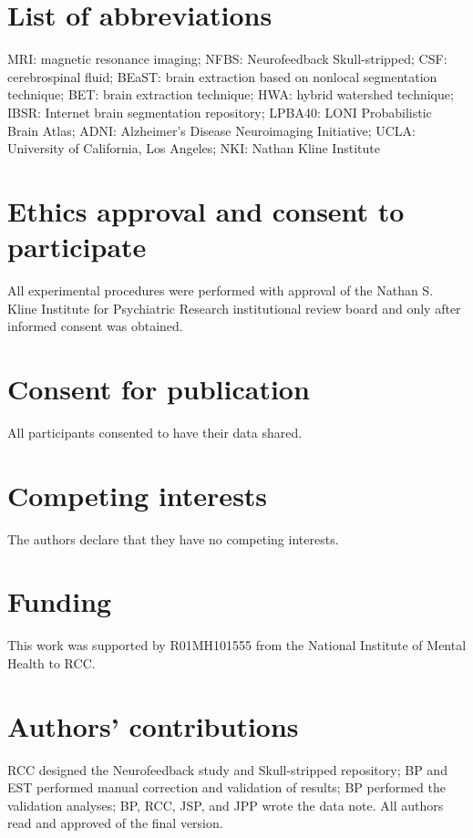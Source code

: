 
\section*{List of abbreviations}
  MRI: magnetic resonance imaging; NFBS: Neurofeedback Skull-stripped; CSF: cerebrospinal fluid; BEaST: brain extraction based on nonlocal segmentation technique; BET: brain extraction technique; HWA: hybrid watershed technique; IBSR: Internet brain segmentation repository; LPBA40: LONI Probabilistic Brain Atlas; ADNI: Alzheimer's Disease Neuroimaging Initiative; UCLA: University of California, Los Angeles; NKI: Nathan Kline Institute
  
\section*{Ethics approval and consent to participate}

All experimental procedures were performed with approval of the Nathan S. Kline Institute for Psychiatric Research institutional review board and only after informed consent was obtained.

\section*{Consent for publication}

All participants consented to have their data shared.


\section*{Competing interests}
  The authors declare that they have no competing interests.
  
\section*{Funding}
This work was supported by R01MH101555 from the National Institute of Mental Health to RCC.


\section*{Authors' contributions}
    RCC designed the Neurofeedback study and Skull-stripped repository;  BP and EST performed manual correction and validation of results; BP performed the validation analyses; BP, RCC, JSP, and JPP wrote the data note. All authors read and approved of the final version.

